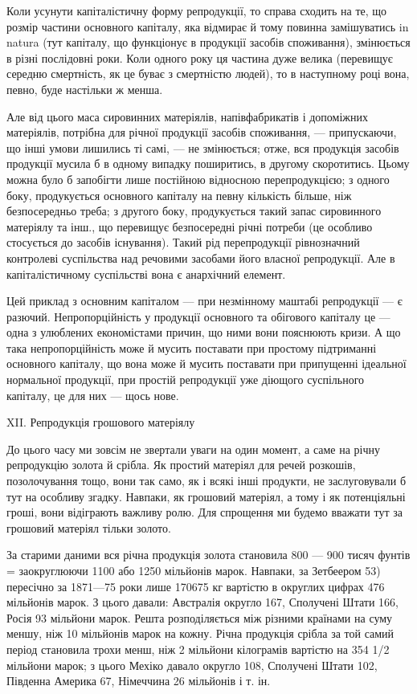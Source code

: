 Коли усунути капіталістичну форму репродукції, то справа сходить
на те, що розмір частини основного капіталу, яка відмирає й тому
повинна замішуватись in natura (тут капіталу, що функціонує в продукції
засобів споживання), змінюється в різні послідовні роки. Коли одного
року ця частина дуже велика (перевищує середню смертність, як це
буває з смертністю людей), то в наступному році вона, певно, буде
настільки ж менша.

Але від цього маса сировинних матеріялів, напівфабрикатів і допоміжних
матеріялів, потрібна для річної продукції засобів споживання, — припускаючи,
що інші умови лишились ті самі, — не змінюється; отже, вся
продукція засобів продукції мусила б в одному випадку поширитись, в
другому скоротитись. Цьому можна було б запобігти лише постійною
відносною перепродукцією; з одного боку, продукується основного
капіталу на певну кількість більше, ніж безпосередньо треба; з другого
боку, продукується такий запас сировинного матеріялу та інш., що
перевищує безпосередні річні потреби (це особливо стосується до засобів
існування). Такий рід перепродукції рівнозначний контролеві суспільства
над речовими засобами його власної репродукції. Але в капіталістичному
суспільстві вона є анархічний елемент.

Цей приклад з основним капіталом — при незмінному маштабі репродукції
— є разючий. Непропорційність у продукції основного та обігового
капіталу це — одна з улюблених економістами причин, що ними вони
пояснюють кризи. А що така непропорційність може й мусить поставати
при простому підтриманні основного капіталу, що вона може й
мусить поставати при припущенні ідеальної нормальної продукції, при
простій репродукції уже діющого суспільного капіталу, це для них — щось
нове.

XII. Репродукція грошового матеріялу

До цього часу ми зовсім не звертали уваги на один момент, а саме
на річну репродукцію золота й срібла. Як простий матеріял для речей
розкошів, позолочування тощо, вони так само, як і всякі інші продукти,
не заслуговували б тут на особливу згадку. Навпаки, як грошовий
матеріял, а тому і як потенціяльні гроші, вони відіграють важливу ролю.
Для спрощення ми будемо вважати тут за грошовий матеріял тільки золото.

За старими даними вся річна продукція золота становила 800 —
900 тисяч фунтів = заокруглюючи 1100 або 1250 мільйонів марок. Навпаки,
за Зетбеером 53) пересічно за 1871—75 роки лише 170675 кг вартістю
в округлих цифрах 476 мільйонів марок. З цього давали: Австралія
округло 167, Сполучені Штати 166, Росія 93 мільйони марок. Решта
розподіляється між різними країнами на суму меншу, ніж 10 мільйонів
марок на кожну. Річна продукція срібла за той самий період становила
трохи менш, ніж 2 мільйони кілограмів вартістю на 354 1/2 мільйони
марок; з цього Мехіко давало округло 108, Сполучені Штати 102,
Південна Америка 67, Німеччина 26 мільйонів і т. ін.

